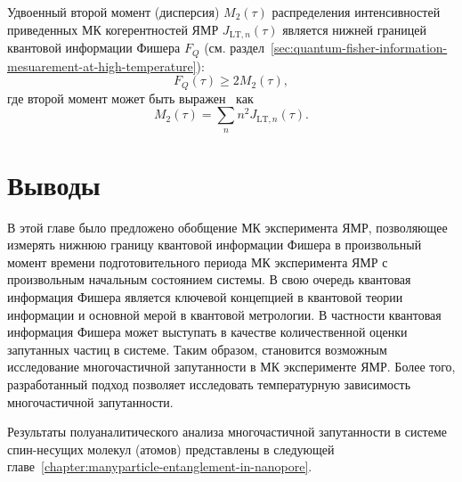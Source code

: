 Удвоенный второй момент (дисперсия) $M_2(\tau)$ распределения интенсивностей приведенных МК когерентностей ЯМР $J_{\mathrm{LT}, n} (\tau)$
является нижней границей квантовой информации Фишера $F_{Q}$
(см. раздел~\ref{sec:quantum-fisher-information-mesuarement-at-high-temperature}):
\begin{equation}\label{eq:fisher-low-bound}
  F_{Q}(\tau) \geq 2M_2(\tau),
\end{equation}
где второй момент может быть выражен~\cite{Khitrin1997} как
%
\begin{equation}\label{eq:m2-via-coherences}
  M_2(\tau) = \sum\limits_n n^2 J_{\mathrm{LT}, n} (\tau).
\end{equation}

\section{Выводы}
В этой главе было предложено обобщение МК эксперимента ЯМР,
позволяющее измерять нижнюю границу квантовой информации Фишера
в произвольный момент времени подготовительного периода МК эксперимента ЯМР
с произвольным начальным состоянием системы.
В свою очередь квантовая информация Фишера является ключевой концепцией в квантовой теории информации
и основной мерой в квантовой метрологии.
В частности квантовая информация Фишера может выступать в качестве количественной оценки запутанных частиц в системе.
Таким образом, становится возможным исследование многочастичной запутанности в МК эксперименте ЯМР.
Более того, разработанный подход позволяет исследовать температурную зависимость многочастичной запутанности.

Результаты полуаналитического анализа многочастичной запутанности в системе спин-несущих молекул (атомов) представлены в следующей главе~\ref{chapter:manyparticle-entanglement-in-nanopore}.
